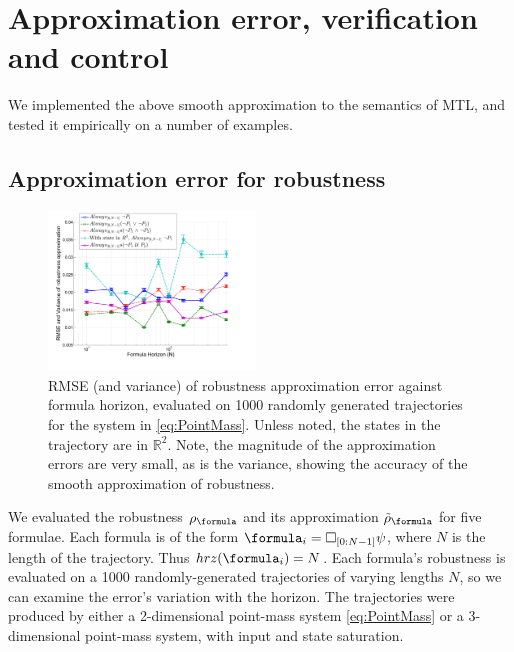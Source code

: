 \section{Approximation error, verification and control}
\label{sec:examples}
We implemented the above smooth approximation to the semantics of MTL, and tested it empirically on a number of examples.

\subsection{Approximation error for robustness}
\label{sec: ex apx error}
\begin{figure}[t]
\centering
\includegraphics[width=0.49\textwidth]{figures/RobustnessError}
\caption{RMSE (and variance) of robustness approximation error against formula horizon, evaluated on 1000 randomly generated trajectories for the system in \eqref{eq:PointMass}. Unless noted, the states in the trajectory are in $\mathbb{R}^2$. Note, the magnitude of the approximation errors are very small, as is the variance, showing the accuracy of the smooth approximation of robustness.}
\label{fig:sample result}
\end{figure}

We evaluated the robustness $\robf$ and its approximation $\srobf$ for five formulae.
Each formula is of the form $\formula_i = \always_{[0:N-1]} \psi$, where $N$ is the length of the trajectory.
Thus $hrz(\formula_i)  = N$.
Each formula's robustness is evaluated on a 1000 randomly-generated trajectories of varying lengths $N$, so we can  examine the error's variation with the horizon.
The trajectories were produced by either a 2-dimensional point-mass system \eqref{eq:PointMass} or a 3-dimensional point-mass system, with input and state saturation.

